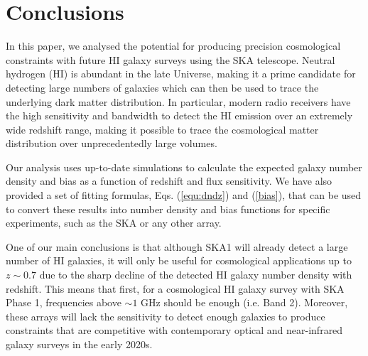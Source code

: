 \documentclass[useAMS,usenatbib]{mn2e}
\begin{document}

\section{Conclusions}

In this paper, we analysed the potential for producing precision cosmological constraints with future HI galaxy surveys using the SKA telescope. Neutral hydrogen (HI) is abundant in the late Universe, making it a prime candidate for detecting large numbers of galaxies which can then be used to trace the underlying dark matter distribution. In particular, modern radio receivers have the high sensitivity and bandwidth to detect the HI emission over an extremely wide redshift range, making it possible to trace the cosmological matter distribution over unprecedentedly large volumes.

Our analysis uses up-to-date simulations to calculate the expected galaxy number density and bias as a function of redshift and flux sensitivity. We have also provided a set of fitting formulas, Eqs. (\ref{equ:dndz}) and (\ref{bias}), that can be used to convert these results into number density and bias functions for specific experiments, such as the SKA or any other array.

One of our main conclusions is that although SKA1 will already detect a large number of HI galaxies, it will only be useful for cosmological applications up to $z\sim 0.7$ due to the sharp decline of the detected HI galaxy number density with redshift. This means that first, for a cosmological HI galaxy survey with SKA Phase 1, frequencies above $\sim 1$ GHz should be enough (i.e. Band 2). Moreover, these arrays will lack the sensitivity to detect enough galaxies to produce constraints that are competitive with contemporary optical and near-infrared galaxy surveys in the early 2020s.
\end{document}
